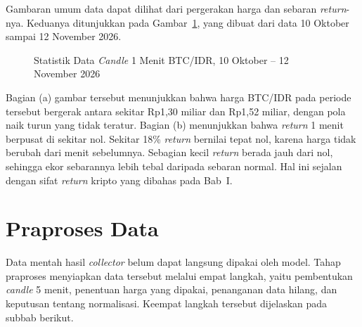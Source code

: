 Gambaran umum data dapat dilihat dari pergerakan harga dan sebaran
\textit{return}-nya. Keduanya ditunjukkan pada Gambar~\ref{fig:statdata}, yang dibuat dari
data 10 Oktober sampai 12 November 2026.

\begin{figure}[!htbp]
  \centering
  \caption[Statistik Data \textit{Candle} 1 Menit BTC/IDR]{Statistik Data
    \textit{Candle} 1 Menit BTC/IDR, 10 Oktober -- 12 November 2026}
  \label{fig:statdata}
\end{figure}

Bagian (a) gambar tersebut menunjukkan bahwa harga BTC/IDR pada
periode tersebut bergerak antara sekitar Rp1,30 miliar dan Rp1,52 miliar,
dengan pola naik turun yang tidak teratur. Bagian (b) menunjukkan bahwa
\textit{return} 1 menit berpusat di sekitar nol. Sekitar 18\% \textit{return}
bernilai tepat nol, karena harga tidak berubah dari menit sebelumnya.
Sebagian kecil \textit{return} berada jauh dari nol, sehingga ekor sebarannya
lebih tebal daripada sebaran normal. Hal ini sejalan dengan sifat
\textit{return} kripto yang dibahas pada Bab~I.

\section{Praproses Data}
\label{sec:praproses}
Data mentah hasil \textit{collector} belum dapat langsung dipakai oleh model.
Tahap praproses menyiapkan data tersebut melalui empat langkah, yaitu
pembentukan \textit{candle} 5 menit, penentuan harga yang dipakai, penanganan
data hilang, dan keputusan tentang normalisasi. Keempat langkah tersebut
dijelaskan pada subbab berikut.

